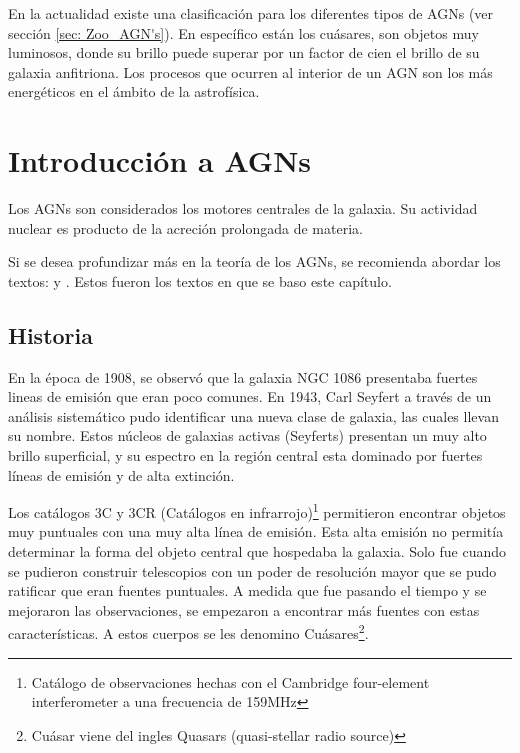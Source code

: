 

En la actualidad existe una clasificación para los diferentes tipos de AGNs (ver sección \ref{sec: Zoo_AGN's}). En específico están los cuásares, son objetos muy luminosos, donde su brillo puede superar por un factor de cien el brillo de su galaxia anfitriona. Los procesos que ocurren al interior de un AGN son los más energéticos en el ámbito de la astrofísica. 


\section{Introducción a AGNs}
\label{sec:Introduction_AGNs}

Los AGNs son considerados los motores centrales de la galaxia. Su actividad nuclear es producto de la acreción prolongada de materia. 

Si se desea profundizar más en la teoría de los AGNs, se recomienda abordar los textos: \cite{schneider2006} y \cite{carroll2007}. Estos fueron los textos en que se baso este capítulo. 


	\subsection{Historia}
	\label{subsec:History}
	
En la época de 1908, se observó que la galaxia NGC 1086 presentaba fuertes lineas de emisión que eran poco comunes. En 1943, Carl Seyfert a través de un análisis sistemático pudo identificar una nueva clase de galaxia, las cuales llevan su nombre. Estos núcleos de galaxias activas (Seyferts) presentan un muy alto brillo superficial, y su espectro en la región central esta dominado por fuertes líneas de emisión y de alta extinción.  

Los catálogos 3C y 3CR (Catálogos en infrarrojo)\footnote{Catálogo de observaciones hechas con el Cambridge four-element interferometer a una frecuencia de 159MHz} permitieron encontrar objetos muy puntuales con una muy alta línea de emisión. Esta alta emisión no permitía determinar la forma del objeto central que hospedaba la galaxia. Solo fue cuando se pudieron construir telescopios con un poder de resolución mayor que se pudo ratificar que eran fuentes puntuales. A medida que fue pasando el tiempo y se mejoraron  las observaciones, se empezaron a encontrar más fuentes con estas características. A estos cuerpos se les denomino  Cuásares\footnote{Cuásar viene del ingles Quasars (quasi-stellar radio source)}.


